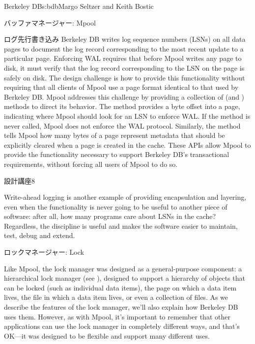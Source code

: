 \begin{aosachapter}{Berkeley DB}{s:bdb}{Margo Seltzer and Keith Bostic}
\begin{aosasect1}{バッファマネージャー: Mpool}
\begin{aosasect2}{ログ先行書き込み}
Berkeley DB writes log sequence numbers (LSNs) on all data pages to
document the log record corresponding to the most recent update to a
particular page.  Enforcing WAL requires that before Mpool writes any
page to disk, it must verify that the log record corresponding to the
LSN on the page is safely on disk.  The design challenge is how to
provide this functionality without requiring that all clients of Mpool
use a page format identical to that used by Berkeley DB\@. Mpool
addresses this challenge by providing a collection of  (and
) methods to direct its behavior.  The  method
 provides a byte offset into a page, indicating
where Mpool should look for an LSN to enforce WAL\@.  If the method is
never called, Mpool does not enforce the WAL protocol. Similarly, the
 method tells Mpool how many bytes of a page
represent metadata that should be explicitly cleared when a page is
created in the cache. These APIs allow Mpool to provide the
functionality necessary to support Berkeley DB's transactional
requirements, without forcing all users of Mpool to do so. 

\begin{aosabox}{設計講座8}

Write-ahead logging is another example of providing encapsulation and
layering, even when the functionality is never going to be useful to
another piece of software: after all, how many programs care about
LSNs in the cache?  Regardless, the discipline is useful and makes the
software easier to maintain, test, debug and extend.

\end{aosabox}

\end{aosasect2}

\end{aosasect1}

\begin{aosasect1}{ロックマネージャー: Lock}


Like Mpool, the lock manager was designed as a general-purpose
component: a hierarchical lock manager (see \cite{bib:gray:lock}),
designed to support a hierarchy of objects that can be locked (such as
individual data items), the page on which a data item lives, the file
in which a data item lives, or even a collection of files. As we
describe the features of the lock manager, we'll also explain how
Berkeley DB uses them.  However, as with Mpool, it's important to
remember that other applications can use the lock manager in
completely different ways, and that's OK---it was designed to be
flexible and support many different uses.


\end{aosasect1}
\end{aosachapter}

